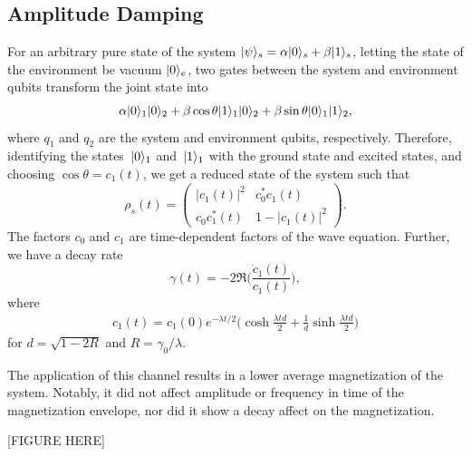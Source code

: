 \documentclass[12pt, twocolumn]{article}
\newcommand*{\eu}{e}
\DeclarePairedDelimiter{\ket}{\lvert}{\rangle}
\begin{document}
  \subsection{Amplitude Damping}
  For an arbitrary pure state of the system \( \ket{\psi}_{s} = \alpha \ket{0}_{s} + \beta \ket{1}_{s} \), letting the state of the environment be vacuum \( \ket{0}_{e} \), two gates between the system and environment qubits transform the joint state into
  \begin{equation*}
    \alpha \ket{0}_{1} \ket{0}_{2} + \beta \cos \theta \ket{1}_{1} \ket{0}_{2}
    + \beta \sin \theta \ket{0}_{1} \ket{1}_{2},
  \end{equation*}
  where \( q_{1} \) and \( q_{2} \) are the system and environment qubits, respectively. Therefore, identifying the states~\( \ket{0}_{1} \) and~\( \ket{1}_{1} \) with the ground state and excited states, and choosing \( \cos \theta = c_{1}(t) \), we get a reduced state of the system such that
  \begin{equation}
    \rho_{s}(t)
      = \begin{pmatrix}
          \lvert c_{1}^{}(t) \rvert^{2} & c_{0}^{*} c_{1}^{}(t)             \\
          c_{0}^{} c_{1}^{*}(t)         & 1 - \lvert c_{1}^{}(t) \rvert^{2}
        \end{pmatrix}.
  \end{equation}
  The factors \( c_{0} \) and \( c_{1} \) are time-dependent factors of the wave equation. Further, we have a decay rate
  \begin{equation}
    \gamma(t) = -2 \Re \biggl( \frac{\dot{c}_{1}(t)}{c_{1}(t)} \biggr),
  \end{equation}
  where
  \begin{align}
    c_{1}(t)
      = c_{1}(0) \eu^{-\lambda t / 2}
        \biggl(
          \cosh \frac{\lambda t d}{2}
            + \frac{1}{d}
              \sinh \frac{\lambda t d}{2}
        \biggr)
  \end{align}
  for \( d = \sqrt{1 - 2 R} \) and \( R = \gamma_{0} / \lambda \).

  The application of this channel results in a lower average magnetization of the system. Notably, it did not affect amplitude or frequency in time of the magnetization envelope, nor did it show a decay affect on the magnetization.

  [FIGURE HERE]
\end{document}
